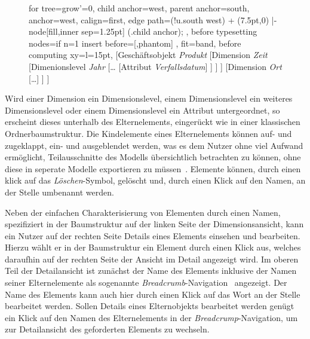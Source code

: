 \documentclass[
  language=german, %
  type=bachelor%
]{isthesis}
\begin{document}
\begin{content}
\begin{figure}[caption={Baumstruktur des Geschäftsobjekts \textit{Produkt}}, label={fig:baumstruktur-produkt}]
		\begin{forest}
			for tree={grow'=0,
				child anchor=west,
				parent anchor=south,
				anchor=west,
				calign=first,
				edge path={\noexpand{}
					(!u.south west) + (7.5pt,0) |- node[fill,inner sep=1.25pt] {} (.child anchor);
				},
				before typesetting nodes={if n=1
						{insert before={[,phantom]}}
						{}
				},
				fit=band,
				before computing xy={l=15pt},
			}
		[Geschäftsobjekt \textit{Produkt}
			[Dimension \textit{Zeit}
				[Dimenionslevel \textit{Jahr}
					[\ldots{}
						[Attribut \textit{Verfallsdatum}]
					]
				]
			]
			[Dimension \textit{Ort}
				[\ldots{}]
			]
		]
		\end{forest}
	\end{figure}

  Wird einer Dimension ein Dimensionslevel, einem Dimensionslevel ein weiteres
  Dimensionslevel oder einem Dimensionslevel ein Attribut untergeordnet, so
  erscheint dieses unterhalb des Elternelements, eingerückt wie in einer
  klassischen Ordnerbaumstruktur. Die Kindelemente eines Elternelements können
  auf- und zugeklappt, \bzw{} ein- und ausgeblendet werden, was es dem Nutzer
  ohne viel Aufwand ermöglicht, Teilausschnitte des Modells übersichtlich
  betrachten zu können, ohne diese in seperate Modelle exportieren zu
  müssen~\cite[][S. 6 f.]{fleischer2013konstruktion}.  Elemente können, durch einen klick auf
  das \textit{Löschen}-Symbol, gelöscht und, durch einen Klick auf den Namen, an
  der Stelle umbenannt werden.

  Neben der einfachen Charakterisierung von Elementen durch einen Namen,
  spezifiziert in der Baumstruktur auf der linken Seite der Dimensionsansicht,
  kann ein Nutzer auf der rechten Seite Details eines Elements einsehen und
  bearbeiten.  Hierzu wählt er in der Baumstruktur ein Element durch einen
  Klick aus, welches daraufhin auf der rechten Seite der Ansicht im Detail
  angezeigt wird. Im oberen Teil der Detailansicht ist zunächst der Name des
  Elements inklusive der Namen seiner Elternelemente als sogenannte
  \textit{Breadcrumb}-Navigation~\cite[][S. 1316]{maldonado2002common}
  angezeigt.  Der Name des Elements kann auch hier durch einen Klick auf das
  Wort an der Stelle bearbeitet werden. Sollen Details eines Elternobjekts
  bearbeitet werden genügt ein Klick auf den Namen des Elternelements in der
  \textit{Breadcrump}-Navigation, um zur Detailansicht des geforderten Elements
  zu wechseln. 


\end{content}
\end{document}

